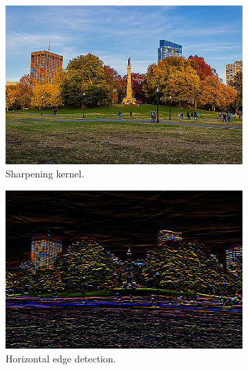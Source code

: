 \documentclass{article}
\begin{document}
\begin{example}
\begin{figure}[H]
        \begin{subfigure}[b]{0.32\textwidth}
        \centering
            \includegraphics[width=\textwidth]{img/03_CNN/Sharpen.png}
            \caption{Sharpening kernel. } \label{fig:sharpened_image}
        \end{subfigure} 
        \begin{subfigure}[b]{0.32\textwidth}
        \centering
            \includegraphics[width=\textwidth]{img/03_CNN/Horizontal.png}
            \caption{Horizontal edge detection. }
            \label{fig:horizontal_edge}
        \end{subfigure}
        \begin{subfigure}[b]{0.32\textwidth}
        \centering

\end{subfigure}
\end{figure}
\end{example}
\end{document}
